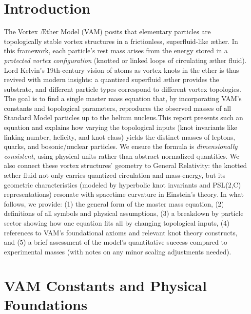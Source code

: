 \section*{Introduction}

The Vortex Æther Model (VAM) posits that elementary particles are topologically stable vortex structures in a frictionless, superfluid-like æther. In this framework, each particle’s rest mass arises from the energy stored in a \textit{protected vortex configuration} (knotted or linked loops of circulating æther fluid). Lord Kelvin’s 19th-century vision of atoms as vortex knots in the ether is thus revived with modern insights: a quantized superfluid æther provides the substrate, and different particle types correspond to different vortex topologies. The goal is to find a single master mass equation that, by incorporating VAM’s constants and topological parameters, reproduces the observed masses of all Standard Model particles up to the helium nucleus.This report presents such an equation and explains how varying the topological inputs (knot invariants like linking number, helicity, and knot class) yields the distinct masses of leptons, quarks, and bosonic/nuclear particles. We ensure the formula is \textit{dimensionally consistent}, using physical units rather than abstract normalized quantities. We also connect these vortex structures’ geometry to General Relativity: the knotted æther fluid not only carries quantized circulation and mass-energy, but its geometric characteristics (modeled by hyperbolic knot invariants and PSL(2,C) representations) resonate with spacetime curvature in Einstein’s theory. In what follows, we provide: (1) the general form of the master mass equation, (2) definitions of all symbols and physical assumptions, (3) a breakdown by particle sector showing how one equation fits all by changing topological inputs, (4) references to VAM’s foundational axioms and relevant knot theory constructs, and (5) a brief assessment of the model’s quantitative success compared to experimental masses (with notes on any minor scaling adjustments needed).\section*{VAM Constants and Physical Foundations}

